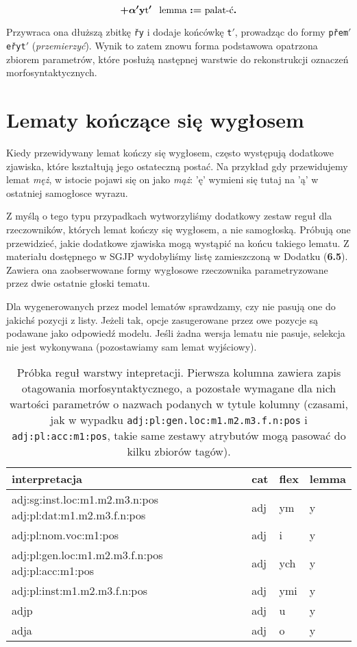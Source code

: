\documentclass{article}
\begin{document}
\[
+\boldmath\alpha'{\bf y}\text{t$'$} \>\>\> \text{lemma}:=\text{palat-ć}.
  \]

Przywraca ona dłuższą zbitkę \texttt{řy} i dodaje końcówkę \texttt{t$'$}, prowadząc do formy \texttt{přem$'$eřyt$'$} (\textit{przemierzyć}). Wynik to zatem znowu forma podstawowa opatrzona zbiorem parametrów, które posłużą następnej warstwie do rekonstrukcji oznaczeń morfosyntaktycznych.

\section{Lematy kończące się wygłosem}
Kiedy przewidywany lemat kończy się wygłosem, często występują dodatkowe zjawiska, które kształtują jego ostateczną postać.
Na przykład gdy przewidujemy lemat \textit{męż}, w istocie pojawi się on jako \textit{mąż}: 'ę' wymieni się tutaj na 'ą'
w ostatniej samogłosce wyrazu.

Z myślą o tego typu przypadkach wytworzyliśmy dodatkowy zestaw reguł dla rzeczowników, których lemat kończy się wygłosem, a nie samogłoską.
Próbują one przewidzieć, jakie dodatkowe zjawiska mogą wystąpić na końcu takiego lematu.
Z materiału dostępnego w SGJP wydobyliśmy listę zamieszczoną w Dodatku (\textbf{6.5}).
Zawiera ona zaobserwowane formy wygłosowe rzeczownika parametryzowane przez dwie ostatnie głoski tematu.

Dla wygenerowanych przez model lematów sprawdzamy, czy nie pasują one do jakichś pozycji z listy. Jeżeli tak, opcje zasugerowane przez owe pozycje są podawane jako odpowiedź modelu.
Jeśli żadna wersja lematu nie pasuje, selekcja nie jest wykonywana (pozostawiamy sam lemat wyjściowy).

\begin{table}
  \centering
  \begin{tabular}{p{7cm}|l|l|l}
interpretacja & cat & flex & lemma\\
\hline
adj:sg:inst.loc:m1.m2.m3.n:pos adj:pl:dat:m1.m2.m3.f.n:pos & adj & ym & y\\
adj:pl:nom.voc:m1:pos & adj & i & y\\
adj:pl:gen.loc:m1.m2.m3.f.n:pos adj:pl:acc:m1:pos & adj & ych & y\\
adj:pl:inst:m1.m2.m3.f.n:pos & adj & ymi & y\\
adjp & adj & u & y\\
adja & adj & o & y\\
\hline
\end{tabular}
\caption{Próbka reguł warstwy intepretacji. Pierwsza kolumna zawiera zapis otagowania morfosyntaktycznego, a pozostałe wymagane dla nich wartości parametrów o nazwach podanych w tytule kolumny (czasami, jak w wypadku \texttt{adj:pl:gen.loc:m1.m2.m3.f.n:pos} i \texttt{adj:pl:acc:m1:pos}, takie same zestawy atrybutów mogą pasować do kilku zbiorów tagów).\label{table:interp}}
\end{table}
\end{document}
